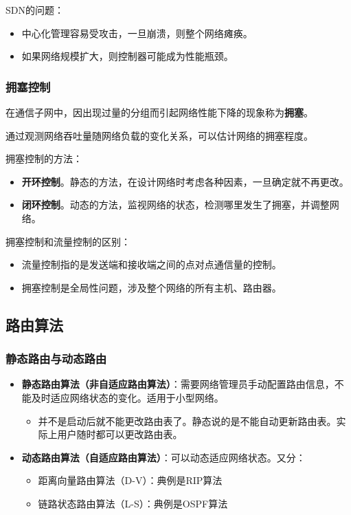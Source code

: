 \documentclass[12pt, a4paper, oneside]{ctexart}
\begin{document}
SDN的问题：
\begin{itemize}
    \item 中心化管理容易受攻击，一旦崩溃，则整个网络瘫痪。
    \item 如果网络规模扩大，则控制器可能成为性能瓶颈。
\end{itemize}

\subsubsection{拥塞控制}

在通信子网中，因出现过量的分组而引起网络性能下降的现象称为\textbf{拥塞}。

通过观测网络吞吐量随网络负载的变化关系，可以估计网络的拥塞程度。

拥塞控制的方法：
\begin{itemize}
    \item {\bf 开环控制}。静态的方法，在设计网络时考虑各种因素，一旦确定就不再更改。
    \item {\bf 闭环控制}。动态的方法，监视网络的状态，检测哪里发生了拥塞，并调整网络。
\end{itemize}

拥塞控制和流量控制的区别：
\begin{itemize}
    \item 流量控制指的是发送端和接收端之间的点对点通信量的控制。
    \item 拥塞控制是全局性问题，涉及整个网络的所有主机、路由器。
\end{itemize}

\subsection{路由算法}

\subsubsection{静态路由与动态路由}

\begin{itemize}
    \item {\bf 静态路由算法（非自适应路由算法）}：需要网络管理员手动配置路由信息，不能及时适应网络状态的变化。适用于小型网络。
    \begin{itemize}
        \item 并不是启动后就不能更改路由表了。静态说的是不能自动更新路由表。实际上用户随时都可以更改路由表。
    \end{itemize}
    \item {\bf 动态路由算法（自适应路由算法）}：可以动态适应网络状态。又分：
    \begin{itemize}
        \item 距离向量路由算法（D-V）：典例是RIP算法
        \item 链路状态路由算法（L-S）：典例是OSPF算法
    \end{itemize}
\end{itemize}
\end{document}
